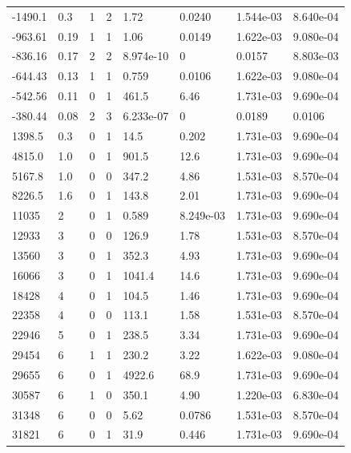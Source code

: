\documentclass[preview]{standalone}
\begin{document}
{{\begin{tabular}{L{1.2cm}C{1.2cm} C{0.3cm}C{0.5cm} C{1.4cm}C{1.4cm} C{1.4cm}C{1.4cm}}
  -1490.1  &   0.3  & 1     &  2 &  1.72  & 0.0240  & 1.544e-03 &  8.640e-04   \\ 
  -963.61  &  0.19  & 1     &  1 &  1.06  & 0.0149  & 1.622e-03 &  9.080e-04   \\ 
  -836.16  &  0.17  & 2     &  2 &  8.974e-10  & 0  & 0.0157 &  8.803e-03   \\ 
  -644.43  &  0.13  & 1     &  1 &  0.759  & 0.0106  & 1.622e-03 &  9.080e-04   \\ 
  -542.56  &  0.11  & 0     &  1 &  461.5  & 6.46  & 1.731e-03 &  9.690e-04   \\ 
  -380.44  &  0.08  & 2     &  3 &  6.233e-07  & 0  & 0.0189 &  0.0106   \\ 
  1398.5  &   0.3  & 0     &  1 &  14.5  & 0.202  & 1.731e-03 &  9.690e-04   \\ 
  4815.0  &   1.0  & 0     &  1 &  901.5  & 12.6  & 1.731e-03 &  9.690e-04   \\ 
  5167.8  &   1.0  & 0     &  0 &  347.2  & 4.86  & 1.531e-03 &  8.570e-04   \\ 
  8226.5  &   1.6  & 0     &  1 &  143.8  & 2.01  & 1.731e-03 &  9.690e-04   \\ 
  11035  &     2  & 0     &  1 &  0.589  & 8.249e-03  & 1.731e-03 &  9.690e-04   \\ 
  12933  &     3  & 0     &  0 &  126.9  & 1.78  & 1.531e-03 &  8.570e-04   \\ 
  13560  &     3  & 0     &  1 &  352.3  & 4.93  & 1.731e-03 &  9.690e-04   \\ 
  16066  &     3  & 0     &  1 &  1041.4  & 14.6  & 1.731e-03 &  9.690e-04   \\ 
  18428  &     4  & 0     &  1 &  104.5  & 1.46  & 1.731e-03 &  9.690e-04   \\ 
  22358  &     4  & 0     &  0 &  113.1  & 1.58  & 1.531e-03 &  8.570e-04   \\ 
  22946  &     5  & 0     &  1 &  238.5  & 3.34  & 1.731e-03 &  9.690e-04   \\ 
  29454  &     6  & 1     &  1 &  230.2  & 3.22  & 1.622e-03 &  9.080e-04   \\ 
  29655  &     6  & 0     &  1 &  4922.6  & 68.9  & 1.731e-03 &  9.690e-04   \\ 
  30587  &     6  & 1     &  0 &  350.1  & 4.90  & 1.220e-03 &  6.830e-04   \\ 
  31348  &     6  & 0     &  0 &  5.62  & 0.0786  & 1.531e-03 &  8.570e-04   \\ 
  31821  &     6  & 0     &  1 &  31.9  & 0.446  & 1.731e-03 &  9.690e-04   \\ 

\end{tabular}}}
\end{document}
